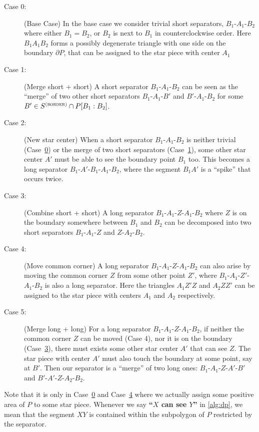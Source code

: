 \documentclass[10pt,a4paper]{article}
\newcommand\Sbor{S^{\textsc{(border)}}}
\begin{document}
\newcommand\DPCase[1]{Case~\hyperref[itm:case#1]{#1}}

\begin{description}
 \item[Case 0:\label{itm:case0}] (Base Case) In the base case we consider trivial short separators, $B_1$-$A_1$-$B_2$ where either $B_1 = B_2$, or $B_2$ is next to $B_1$ in counterclockwise order. 
 Here $B_1 A_1 B_2$ forms a possibly degenerate triangle with one side on the boundary $\partial P$, that can be assigned to the star piece with center $A_1$
 \item[Case 1:\label{itm:case1}] (Merge short + short) A short separator $B_1$-$A_1$-$B_2$ can be seen as the ``merge'' of two other short separators $B_1$-$A_1$-$B'$ and $B'$-$A_1$-$B_2$ for some $B'\in \Sbor \cap P[B_1:B_2]$.
 \item[Case 2:\label{itm:case2}] (New star center) When a short separator $B_1$-$A_1$-$B_2$ is neither trivial (\DPCase{0}) or the merge of two short separators (\DPCase{1}), some other star center $A'$ must be able to see the boundary point $B_1$ too. This becomes a long separator $B_1$-$A'$-$B_1$-$A_1$-$B_2$, where the segment $B_1A'$ is a ``spike'' that occurs twice.
 \item[Case 3:\label{itm:case3}] (Combine short + short) A long separator $B_1$-$A_1$-$Z$-$A_1$-$B_2$ where $Z$ is on the boundary somewhere between $B_1$ and $B_2$ can be decomposed into two short separators $B_1$-$A_1$-$Z$ and $Z$-$A_2$-$B_2$.
 \item[Case 4:\label{itm:case4}] (Move common corner) A long separator $B_1$-$A_1$-$Z$-$A_1$-$B_2$ can also arise by moving the common corner $Z$ from some other point $Z'$, where $B_1$-$A_1$-$Z'$-$A_1$-$B_2$  is also a long separator. Here the triangles $A_1 Z' Z$ and $A_2ZZ'$ can be assigned to the star piece with centers $A_1$ and $A_2$ respectively.
 \item[Case 5:\label{itm:case5}] (Merge long + long) For a long separator $B_1$-$A_1$-$Z$-$A_1$-$B_2$, if neither the common corner $Z$ can be moved (Case 4), nor it is on the boundary (\DPCase{3}), there must exists some other star center $A'$ that can see $Z$. The star piece with center $A'$ must also touch the boundary at some point, say at $B'$. Then 
 our separator is a ``merge'' of two long ones: 
 $B_1$-$A_1$-$Z$-$A'$-$B'$
 and  $B'$-$A'$-$Z$-$A_2$-$B_2$.
\end{description}
Note that it is only in \DPCase{0} and \DPCase{4} where we actually assign some positive area of $P$ to some star piece.
Whenever we say \textbf{``$X$ can see $Y$''} in \cref{alg:dp}, we mean that the segment $XY$ is contained within the subpolygon of $P$ restricted by the separator.
\end{document}
